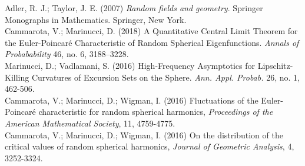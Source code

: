 \documentclass[10]{beamer}
\begin{document}
\begin{thebibliography}{99}
 Adler, R. J.; Taylor, J. E. (2007)
  \textit{Random fields and geometry}. Springer Monographs in
  Mathematics. Springer,
  New York. \\
  
  Cammarota, V.; Marinucci, D. (2018) A
  Quantitative Central Limit Theorem for the Euler-Poincaré
  Characteristic of Random Spherical
  Eigenfunctions. \textit{Annals of Probabability }46, no. 6,
  3188–3228. \\

 Marinucci, D.; Vadlamani, S. (2016)
  High-Frequency Asymptotics for Lipschitz-Killing Curvatures
  of Excursion Sets on the Sphere. \textit{Ann. Appl. Probab.}
  26, no. 1, 462-506. \\
            
 Cammarota, V.; Marinucci, D.; Wigman, I. (2016)
  Fluctuations of the Euler-Poincar\'e characteristic for random
  spherical harmonics,
  \textit{Proceedings of the American Mathematical Society}, 11,
  4759-4775. \\
  
  
 Cammarota, V.; Marinucci, D.; Wigman,
  I. (2016) On the distribution of the critical values of random
  spherical harmonics, \textit{Journal of Geometric Analysis},
  4, 3252-3324.
	        
\end{thebibliography}










\end{document}
